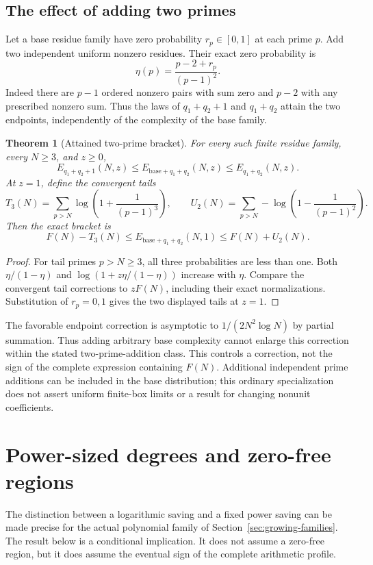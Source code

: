 \documentclass[11pt]{article}
\newtheorem{theorem}{Theorem}[section]
\theoremstyle{definition}
\begin{document}
\subsection{The effect of adding two primes}
Let a base residue family have zero probability $r_p\in[0,1]$ at
each prime $p$. Add two independent uniform nonzero residues.
Their exact zero probability is
\[
 \eta(p)=\frac{p-2+r_p}{(p-1)^2}.
\]
Indeed there are $p-1$ ordered nonzero pairs with sum zero and
$p-2$ with any prescribed nonzero sum. Thus the laws of $q_1+q_2+1$
and $q_1+q_2$ attain the two endpoints, independently of the
complexity of the base family.

\begin{theorem}[Attained two-prime bracket]\label{thm:two-prime-bracket}
For every such finite residue family, every $N\ge3$, and $z\ge0$,
\[
 E_{q_1+q_2+1}(N,z)\le E_{\mathrm{base}+q_1+q_2}(N,z)
       \le E_{q_1+q_2}(N,z).
\]
At $z=1$, define the convergent tails
\[
 T_3(N)=\sum_{p>N}\log\left(1+\frac1{(p-1)^3}\right),\qquad
 U_2(N)=\sum_{p>N}-\log\left(1-\frac1{(p-1)^2}\right).
\]
Then the exact bracket is
\[
 F(N)-T_3(N)\le E_{\mathrm{base}+q_1+q_2}(N,1)\le F(N)+U_2(N).
\]
\end{theorem}
\begin{proof}
For tail primes $p>N\ge3$, all three probabilities are less than one.
Both $\eta/(1-\eta)$ and $\log(1+z\eta/(1-\eta))$ increase with
$\eta$. Compare the convergent tail corrections to $zF(N)$,
including their exact normalizations. Substitution of $r_p=0,1$
gives the two displayed tails at $z=1$.
\end{proof}
The favorable endpoint correction is asymptotic to
$1/(2N^2\log N)$ by partial summation. Thus adding arbitrary base
complexity cannot enlarge this correction within the stated
two-prime-addition class. This controls a correction, not the sign
of the complete expression containing $F(N)$. Additional independent
prime additions can be included in the base distribution; this
ordinary specialization does not assert uniform finite-box limits
or a result for changing nonunit coefficients.

\section{Power-sized degrees and zero-free regions}\label{sec:power-degree}
The distinction between a logarithmic saving and a fixed power saving
can be made precise for the actual polynomial family of
Section~\ref{sec:growing-families}. The result below is a conditional
implication. It does not assume a zero-free region, but it does assume
the eventual sign of the complete arithmetic profile.
\end{document}
